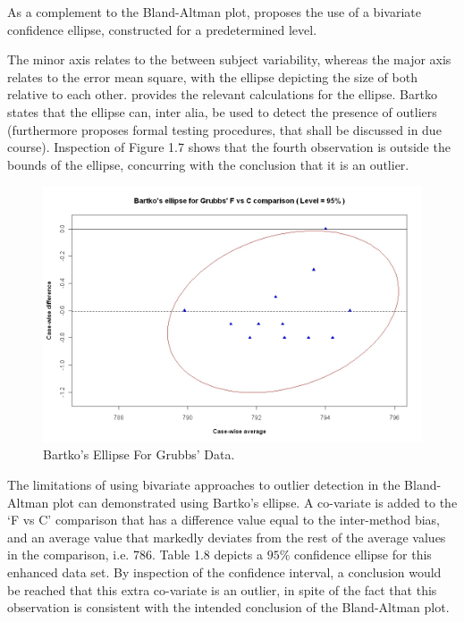 \documentclass[Main.tex]{subfiles}
\begin{document}
As a complement to the Bland-Altman plot, \citet{Bartko} proposes
the use of a bivariate confidence ellipse, constructed for a
predetermined level.

The minor axis relates to the between subject variability, whereas the major axis relates to the error mean square, with the ellipse
depicting the size of both relative to each	other.\citet{AltmanEllipse} provides the relevant calculations for
the ellipse. Bartko states that the ellipse can, inter alia, be
used to detect the presence of outliers (furthermore \citet{Bartko} proposes formal testing procedures, that shall be
discussed in due course). Inspection of Figure 1.7 shows that the
fourth observation is outside the bounds of the ellipse, concurring with the conclusion that it is an outlier.


\begin{figure}[h!]
	\includegraphics[width=130mm]{images/GrubbsBartko.jpeg}
	\caption{Bartko's Ellipse For Grubbs' Data.}\label{GrubbsBartko}
\end{figure}

The limitations of using bivariate approaches to outlier detection
in the Bland-Altman plot can demonstrated using Bartko's ellipse.
A co-variate is added to the `F vs C' comparison that has a	difference value equal to the inter-method bias, and an average	value that markedly deviates from the rest of the average values in the comparison, i.e. 786. Table 1.8 depicts a $95\%$ confidence
ellipse for this enhanced data set. By inspection of the confidence interval, a conclusion would be reached that this extra
co-variate is an outlier, in spite of the fact that this observation is consistent with the intended conclusion of the
Bland-Altman plot.
\end{document}
